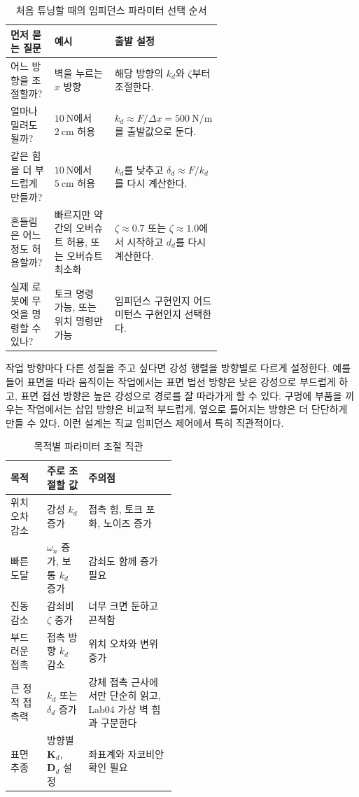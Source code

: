 \begin{table}[!htbp]
  \centering
  \caption{처음 튜닝할 때의 임피던스 파라미터 선택 순서}
  \small
  \setlength{\tabcolsep}{4pt}
  \begin{tabularx}{\linewidth}{@{}>{\raggedright\arraybackslash}p{0.25\linewidth}>{\raggedright\arraybackslash}p{0.35\linewidth}>{\raggedright\arraybackslash}X@{}}
    \toprule
    먼저 묻는 질문 & 예시 & 출발 설정 \\
    \midrule
    어느 방향을 조절할까? & 벽을 누르는 $x$ 방향 & 해당 방향의 $k_d$와 $\zeta$부터 조절한다. \\
    얼마나 밀려도 될까? & $10~\mathrm{N}$에서 $2~\mathrm{cm}$ 허용 & $k_d \approx F/\Delta x = 500~\mathrm{N/m}$를 출발값으로 둔다. \\
    같은 힘을 더 부드럽게 만들까? & $10~\mathrm{N}$에서 $5~\mathrm{cm}$ 허용 & $k_d$를 낮추고 $\delta_d \approx F/k_d$를 다시 계산한다. \\
    흔들림은 어느 정도 허용할까? & 빠르지만 약간의 오버슈트 허용, 또는 오버슈트 최소화 & $\zeta\approx0.7$ 또는 $\zeta\approx1.0$에서 시작하고 $d_d$를 다시 계산한다. \\
    실제 로봇에 무엇을 명령할 수 있나? & 토크 명령 가능, 또는 위치 명령만 가능 & 임피던스 구현인지 어드미턴스 구현인지 선택한다. \\
    \bottomrule
  \end{tabularx}
  \label{tab:beginner-impedance-tuning-order}
\end{table}

작업 방향마다 다른 성질을 주고 싶다면 강성 행렬을 방향별로 다르게 설정한다.
예를 들어 표면을 따라 움직이는 작업에서는 표면 법선 방향은 낮은 강성으로 부드럽게 하고, 표면 접선 방향은 높은 강성으로 경로를 잘 따라가게 할 수 있다.
구멍에 부품을 끼우는 작업에서는 삽입 방향은 비교적 부드럽게, 옆으로 틀어지는 방향은 더 단단하게 만들 수 있다.
이런 설계는 직교 임피던스 제어에서 특히 직관적이다.

\begin{table}[!htbp]
  \centering
  \caption{목적별 파라미터 조절 직관}
  \small
  \setlength{\tabcolsep}{4pt}
  \begin{tabularx}{\linewidth}{@{}>{\raggedright\arraybackslash}p{0.22\linewidth}>{\raggedright\arraybackslash}p{0.25\linewidth}>{\raggedright\arraybackslash}X@{}}
    \toprule
    목적 & 주로 조절할 값 & 주의점 \\
    \midrule
    위치 오차 감소 & 강성 $k_d$ 증가 & 접촉 힘, 토크 포화, 노이즈 증가 \\
    빠른 도달 & $\omega_n$ 증가, 보통 $k_d$ 증가 & 감쇠도 함께 증가 필요 \\
    진동 감소 & 감쇠비 $\zeta$ 증가 & 너무 크면 둔하고 끈적함 \\
    부드러운 접촉 & 접촉 방향 $k_d$ 감소 & 위치 오차와 변위 증가 \\
    큰 정적 접촉력 & $k_d$ 또는 $\delta_d$ 증가 & 강체 접촉 근사에서만 단순히 읽고, Lab04 가상 벽 힘과 구분한다 \\
    표면 추종 & 방향별 $\bm{K}_d$, $\bm{D}_d$ 설정 & 좌표계와 자코비안 확인 필요 \\
    \bottomrule
  \end{tabularx}
\end{table}

